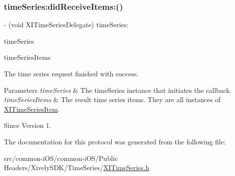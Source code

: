 \subsubsection{\texorpdfstring{time\+Series\+:did\+Receive\+Items\+:()}{timeSeries:didReceiveItems:()}}
{\footnotesize\ttfamily -\/ (void X\+I\+Time\+Series\+Delegate) time\+Series\+: \begin{DoxyParamCaption}\item[{(id$<$ X\+I\+Time\+Series $>$)}]{time\+Series }\item[{didReceiveItems:(N\+S\+Array $\ast$)}]{time\+Series\+Items }\end{DoxyParamCaption}}



The time series request finished with success. 


\begin{DoxyParams}{Parameters}
{\em time\+Series} & The time\+Series instance that initiates the callback. \\
\hline
{\em time\+Series\+Items} & The result time series items. They are all instances of \hyperlink{interface_x_i_time_series_item}{X\+I\+Time\+Series\+Item}. \\
\hline
\end{DoxyParams}
\begin{DoxySince}{Since}
Version 1. 
\end{DoxySince}


The documentation for this protocol was generated from the following file\+:\begin{DoxyCompactItemize}
\item 
src/common-\/i\+O\+S/common-\/i\+O\+S/\+Public Headers/\+Xively\+S\+D\+K/\+Time\+Series/\hyperlink{_x_i_time_series_8h}{X\+I\+Time\+Series.\+h}\end{DoxyCompactItemize}
